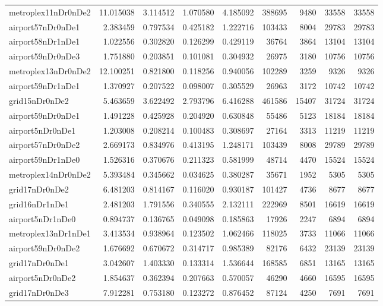 \begin{longtable}{|l|r|r|r|r|r|r|r|r|}
metroplex11nDr0nDe2 & 11.015038 & 3.114512 & 1.070580 & 4.185092 & 388695 & 9480 & 33558 & 33558 \\
airport57nDr0nDe1 & 2.383459 & 0.797534 & 0.425182 & 1.222716 & 103433 & 8004 & 29783 & 29783 \\
airport58nDr1nDe1 & 1.022556 & 0.302820 & 0.126299 & 0.429119 & 36764 & 3864 & 13104 & 13104 \\
airport59nDr0nDe3 & 1.751880 & 0.203851 & 0.101081 & 0.304932 & 26975 & 3180 & 10756 & 10756 \\
metroplex13nDr0nDe2 & 12.100251 & 0.821800 & 0.118256 & 0.940056 & 102289 & 3259 & 9326 & 9326 \\
airport59nDr1nDe1 & 1.370927 & 0.207522 & 0.098007 & 0.305529 & 26963 & 3172 & 10742 & 10742 \\
grid15nDr0nDe2 & 5.463659 & 3.622492 & 2.793796 & 6.416288 & 461586 & 15407 & 31724 & 31724 \\
airport59nDr0nDe1 & 1.491228 & 0.425928 & 0.204920 & 0.630848 & 55486 & 5123 & 18184 & 18184 \\
airport5nDr0nDe1 & 1.203008 & 0.208214 & 0.100483 & 0.308697 & 27164 & 3313 & 11219 & 11219 \\
airport57nDr0nDe2 & 2.669173 & 0.834976 & 0.413195 & 1.248171 & 103439 & 8008 & 29789 & 29789 \\
airport59nDr1nDe0 & 1.526316 & 0.370676 & 0.211323 & 0.581999 & 48714 & 4470 & 15524 & 15524 \\
metroplex14nDr0nDe2 & 5.393484 & 0.345662 & 0.034625 & 0.380287 & 35671 & 1952 & 5305 & 5305 \\
grid17nDr0nDe2 & 6.481203 & 0.814167 & 0.116020 & 0.930187 & 101427 & 4736 & 8677 & 8677 \\
grid16nDr1nDe1 & 2.481203 & 1.791556 & 0.340555 & 2.132111 & 222969 & 8501 & 16619 & 16619 \\
airport5nDr1nDe0 & 0.894737 & 0.136765 & 0.049098 & 0.185863 & 17926 & 2247 & 6894 & 6894 \\
metroplex13nDr1nDe1 & 3.413534 & 0.938964 & 0.123502 & 1.062466 & 118025 & 3733 & 11066 & 11066 \\
airport59nDr0nDe2 & 1.676692 & 0.670672 & 0.314717 & 0.985389 & 82176 & 6432 & 23139 & 23139 \\
grid17nDr0nDe1 & 3.042607 & 1.403330 & 0.133314 & 1.536644 & 168585 & 6851 & 13165 & 13165 \\
airport5nDr0nDe2 & 1.854637 & 0.362394 & 0.207663 & 0.570057 & 46290 & 4660 & 16595 & 16595 \\
grid17nDr0nDe3 & 7.912281 & 0.753180 & 0.123272 & 0.876452 & 87124 & 4250 & 7691 & 7691 \\

\end{longtable}
